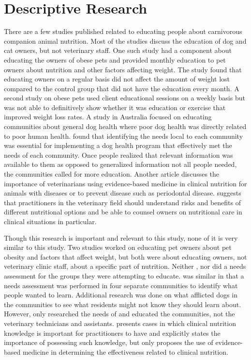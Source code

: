 \section{Descriptive Research}
There are a few studies published related to educating people about carnivorous companion animal nutrition. Most of the studies discuss the education of dog and cat owners, but not veterinary staff. One such study had a component about educating the owners of obese pets and provided monthly education to pet owners about nutrition and other factors affecting weight\citep{yaissle}. The study found that educating owners on a regular basis did not affect the amount of weight lost compared to the control group that did not have the education every month\citep{yaissle}. A second study on obese pets used client educational sessions on a weekly basis but was not able to definitively show whether it was education or exercise that improved weight loss rates\citep{chauvet}. A study in Australia focused on educating communities about general dog health where poor dog health was directly related to poor human health\citep{constable}. \cite{constable} found that identifying the needs local to each community was essential for implementing a dog health program that effectively met the needs of each community. Once people realized that relevant information was available to them as opposed to generalized information not all people needed, the communities called for more education\citep{constable}. Another article discusses the importance of veterinarians using evidence-based medicine in clinical nutrition for animals with diseases or to prevent disease such as periodontal disease\citep{roud2}. \cite{roud2} suggests that practitioners in the veterinary field should understand risks and benefits of different nutritional options and be able to counsel owners on nutritional care in clinical situations in particular.
\par Though this research is important and relevant to this study, none of it is very similar to this study. Two studies worked on educating pet owners about pet obesity and factors that affect weight, but both were about educating owners, not veterinary clinic staff, about a specific part of nutrition\citep{yaissle,chauvet}. Neither \cite{yaissle}, nor \cite{chauvet} did a needs assessment for the groups they were attempting to educate. \cite{constable} was similar in that a needs assessment was performed in four separate communities to identify what people wanted to learn. Additional research was done on what afflicted dogs in the communities to see what residents might not know they should learn about\citep{constable}. However, \citep{constable} only researched the needs of and educated the communities, not the veterinary technicians and assistants. \cite{roud2} presents cases in which clinical nutrition knowledge is important for practitioners to have and explicitly states the importance of possessing such knowledge, but only proposes the use of evidence-based medicine in determining the effectiveness related to clinical nutrition. 

